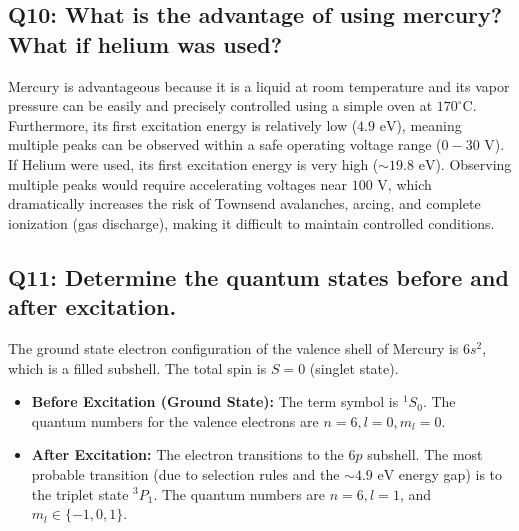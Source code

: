 \documentclass[a4paper,11pt]{article}
\begin{document}
\subsection*{Q10: What is the advantage of using mercury? What if helium was used?}
Mercury is advantageous because it is a liquid at room temperature and its vapor pressure can be easily and precisely controlled using a simple oven at $170^\circ\text{C}$. Furthermore, its first excitation energy is relatively low ($4.9\text{ eV}$), meaning multiple peaks can be observed within a safe operating voltage range ($0 - 30\text{ V}$). 
If Helium were used, its first excitation energy is very high ($\sim 19.8\text{ eV}$). Observing multiple peaks would require accelerating voltages near $100\text{ V}$, which dramatically increases the risk of Townsend avalanches, arcing, and complete ionization (gas discharge), making it difficult to maintain controlled conditions.

\subsection*{Q11: Determine the quantum states before and after excitation.}
The ground state electron configuration of the valence shell of Mercury is $6s^2$, which is a filled subshell. The total spin is $S=0$ (singlet state).
\begin{itemize}
    \item \textbf{Before Excitation (Ground State):} The term symbol is $^1S_0$. The quantum numbers for the valence electrons are $n=6, l=0, m_l=0$.
    \item \textbf{After Excitation:} The electron transitions to the $6p$ subshell. The most probable transition (due to selection rules and the $\sim 4.9\text{ eV}$ energy gap) is to the triplet state $^3P_1$. The quantum numbers are $n=6, l=1$, and $m_l \in \{-1, 0, 1\}$.
\end{itemize}
\end{document}
